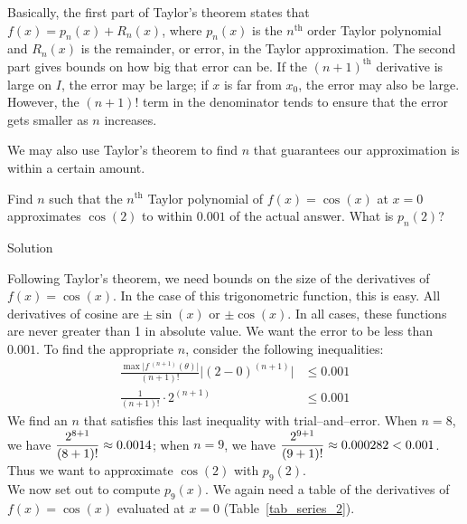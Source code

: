 Basically, the first part of Taylor's theorem states that $f(x) = p_n(x) + R_n(x)$, where $p_n(x)$ is the $n^\text{th}$ order Taylor polynomial and $R_n(x)$ is the remainder, or error, in the Taylor approximation. The second part gives bounds on how big that error can be. If the $(n+1)^\text{th}$ derivative is large on $I$, the error may be large; if $x$ is far from $x_0$, the error may also be large. However, the $(n+1)!$ term in the denominator tends to ensure that the error gets smaller as $n$ increases. 

We may also use Taylor's theorem to find $n$ that guarantees our approximation is within a certain amount.

\begin{example}\label{ex_taypoly4}
Find $n$ such that the $n^\text{th}$ Taylor polynomial of $f(x)=\cos(x)$ at $x=0$ approximates $\cos(2)$ to within $0.001$ of the actual answer. What is $p_n(2)$?

Solution 

Following Taylor's theorem, we need bounds on the size of the derivatives of $f(x)=\cos(x)$. In the case of this trigonometric function, this is easy. All derivatives of cosine are $\pm \sin(x)$ or $\pm \cos(x)$. In all cases, these functions are never greater than 1 in absolute value. We want the error to be less than $0.001$. To find the appropriate $n$, consider the following inequalities:
\begin{align*}
\frac{\max\big|f\,^{(n+1)}(\theta)\big|}{(n+1)!}\big|(2-0)^{(n+1)}\big| &\leq 0.001 \\
\frac1{(n+1)!}\cdot2^{(n+1)} &\leq 0.001
\end{align*}
We find an $n$ that satisfies this last inequality with trial--and--error. When $n=8$, we have $\displaystyle \frac{2^{8+1}}{(8+1)!} \approx 0.0014$; when $n=9$, we have $\displaystyle \frac{2^{9+1}}{(9+1)!} \approx 0.000282 <0.001$. Thus we want to approximate $\cos(2)$ with $p_9(2)$.\\

We now set out to compute $p_9(x)$. We again need a table of the derivatives of $f(x)=\cos(x)$ evaluated at $x=0$ (Table~\ref{tab_series_2}).


\end{example}
